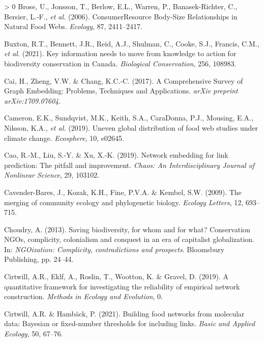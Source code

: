 \documentclass[10pt,oneside]{article}
\newlength{\cslhangindent}
\newenvironment{CSLReferences}[3] %
 {%
  \setlength{\parindent}{0pt}
  \ifodd #1 \everypar{\setlength{\hangindent}{\cslhangindent}}\ignorespaces\fi
  \ifnum #2 > 0
  \setlength{\parskip}{#2\baselineskip}
  \fi
 }%
 {}
\begin{document}
\begin{CSLReferences}{1}{0}
\leavevmode\hypertarget{ref-Brose2006ConRes}{}%
Brose, U., Jonsson, T., Berlow, E.L., Warren, P., Banasek-Richter, C.,
Bersier, L.-F., \emph{et al.} (2006). ConsumerResource Body-Size
Relationships in Natural Food Webs. \emph{Ecology}, 87, 2411--2417.

\leavevmode\hypertarget{ref-Buxton2021KeyInf}{}%
Buxton, R.T., Bennett, J.R., Reid, A.J., Shulman, C., Cooke, S.J.,
Francis, C.M., \emph{et al.} (2021). Key information needs to move from
knowledge to action for biodiversity conservation in Canada.
\emph{Biological Conservation}, 256, 108983.

\leavevmode\hypertarget{ref-Cai2017ComSur}{}%
Cai, H., Zheng, V.W. \& Chang, K.C.-C. (2017). A Comprehensive Survey of
Graph Embedding: Problems, Techniques and Applications. \emph{arXiv
preprint arXiv:1709.07604}.

\leavevmode\hypertarget{ref-Cameron2019UneGlo}{}%
Cameron, E.K., Sundqvist, M.K., Keith, S.A., CaraDonna, P.J., Mousing,
E.A., Nilsson, K.A., \emph{et al.} (2019). Uneven global distribution of
food web studies under climate change. \emph{Ecosphere}, 10, e02645.

\leavevmode\hypertarget{ref-Cao2019NetEmb}{}%
Cao, R.-M., Liu, S.-Y. \& Xu, X.-K. (2019). Network embedding for link
prediction: The pitfall and improvement. \emph{Chaos: An
Interdisciplinary Journal of Nonlinear Science}, 29, 103102.

\leavevmode\hypertarget{ref-Cavender-Bares2009MerCom}{}%
Cavender-Bares, J., Kozak, K.H., Fine, P.V.A. \& Kembel, S.W. (2009).
The merging of community ecology and phylogenetic biology. \emph{Ecology
Letters}, 12, 693--715.

\leavevmode\hypertarget{ref-Choudry2013SavBio}{}%
Choudry, A. (2013). Saving biodiversity, for whom and for what?
Conservation NGOs, complicity, colonialism and conquest in an era of
capitalist globalization. In: \emph{NGOization: Complicity,
contradictions and prospects}. Bloomsbury Publishing, pp. 24--44.

\leavevmode\hypertarget{ref-Cirtwill2019QuaFra}{}%
Cirtwill, A.R., Eklf, A., Roslin, T., Wootton, K. \& Gravel, D. (2019).
A quantitative framework for investigating the reliability of empirical
network construction. \emph{Methods in Ecology and Evolution}, 0.

\leavevmode\hypertarget{ref-Cirtwill2021BuiFoo}{}%
Cirtwill, A.R. \& Hambäck, P. (2021). Building food networks from
molecular data: Bayesian or fixed-number thresholds for including links.
\emph{Basic and Applied Ecology}, 50, 67--76.


\end{CSLReferences}
\end{document}
